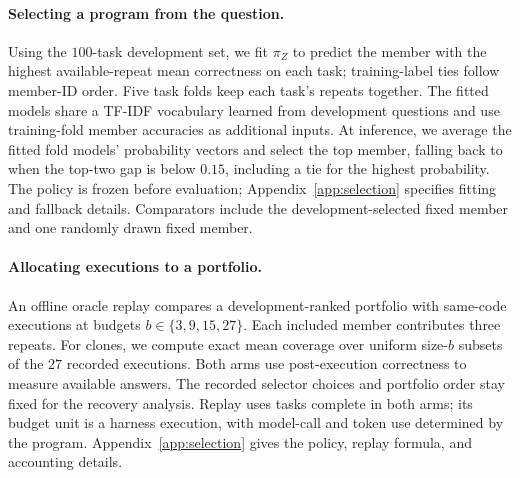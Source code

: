 \paragraph{Selecting a program from the question.}
Using the $100$-task development set, we fit $\pi_Z$ to predict the member
with the highest available-repeat mean correctness on each task;
training-label ties follow member-ID order. Five task folds keep each
task's repeats together. The fitted models share a TF-IDF vocabulary
learned from development questions and use training-fold member
accuracies as additional inputs. At inference, we average the fitted
fold models' probability vectors and select the top member, falling
back to \bare{} when the top-two gap is below $0.15$, including a tie
for the highest probability. The policy is frozen before evaluation;
Appendix~\ref{app:selection} specifies fitting and fallback details.
Comparators include the development-selected fixed member and one
randomly drawn fixed member.

\paragraph{Allocating executions to a portfolio.}
An offline oracle replay compares a development-ranked portfolio with
same-code executions at budgets $b\in\{3,9,15,27\}$. Each included
member contributes three repeats. For clones, we compute exact mean
coverage over uniform size-$b$ subsets of the $27$ recorded executions.
Both arms use post-execution correctness to measure available answers.
The recorded selector choices and portfolio order stay fixed for the
recovery analysis. Replay uses tasks complete in both arms; its budget
unit is a harness execution, with model-call and token use determined
by the program. Appendix~\ref{app:selection} gives the policy, replay
formula, and accounting details.

